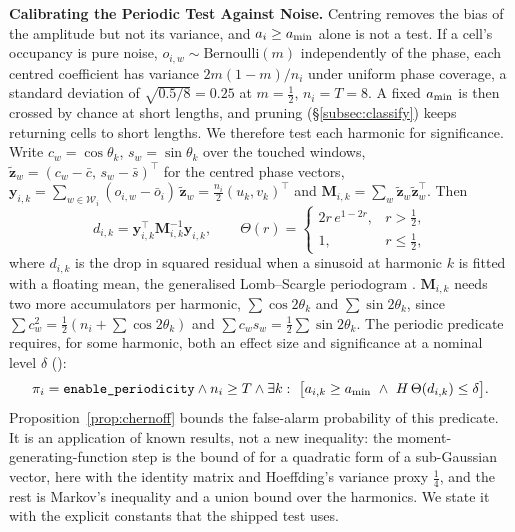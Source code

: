 \noindent\textbf{Calibrating the Periodic Test Against Noise.} Centring removes the bias of the amplitude but not its variance, and $a_i\ge a_{\min}$ alone is not a test. If a cell's occupancy is pure noise, $o_{i,w}\sim\mathrm{Bernoulli}(m)$ independently of the phase, each centred coefficient has variance $2m(1{-}m)/n_i$ under uniform phase coverage, a standard deviation of $\sqrt{0.5/8}=0.25$ at $m{=}\tfrac12$, $n_i{=}T{=}8$. A fixed $a_{\min}$ is then crossed by chance at short lengths, and pruning (\S\ref{subsec:classify}) keeps returning cells to short lengths. We therefore test each harmonic for significance. Write $c_w=\cos\theta_k$, $s_w=\sin\theta_k$ over the touched windows, $\tilde{\mathbf{z}}_w=(c_w-\bar c,\,s_w-\bar s)^{\top}$ for the centred phase vectors, $\mathbf{y}_{i,k}=\sum_{w\in\mathcal{W}_i}(o_{i,w}-\bar o_i)\,\tilde{\mathbf{z}}_w=\tfrac{n_i}{2}(u_k,v_k)^{\top}$ and $\mathbf{M}_{i,k}=\sum_{w}\tilde{\mathbf{z}}_w\tilde{\mathbf{z}}_w^{\top}$. Then
\begin{equation}\label{eq:dchi}
  d_{i,k}=\mathbf{y}_{i,k}^{\top}\mathbf{M}_{i,k}^{-1}\mathbf{y}_{i,k},\qquad \Theta(r)=\begin{cases}2r\,e^{1-2r}, & r>\tfrac12,\\ 1, & r\le\tfrac12,\end{cases}
\end{equation}
where $d_{i,k}$ is the drop in squared residual when a sinusoid at harmonic $k$ is fitted with a floating mean, the generalised Lomb--Scargle periodogram \citep{zechmeister2009gls}. $\mathbf{M}_{i,k}$ needs two more accumulators per harmonic, $\sum\cos2\theta_k$ and $\sum\sin2\theta_k$, since $\sum c_w^2=\tfrac12(n_i+\sum\cos2\theta_k)$ and $\sum c_ws_w=\tfrac12\sum\sin2\theta_k$. The periodic predicate requires, for some harmonic, both an effect size and significance at a nominal level $\delta$ ():
\begin{equation}\label{eq:periodic}
  \pi_i=\texttt{enable\_periodicity}\land n_i\ge T\land\exists k:\ \big[a_{i,k}\ge\amin\ \land\ H\,\Theta(d_{i,k})\le\delta\big].
\end{equation}
Proposition~\ref{prop:chernoff} bounds the false-alarm probability of this predicate. It is an application of known results, not a new inequality: the moment-generating-function step is the bound of \citet[Remark~2]{hsu2012tail} for a quadratic form of a sub-Gaussian vector, here with the identity matrix and Hoeffding's variance proxy $\tfrac14$, and the rest is Markov's inequality and a union bound over the harmonics. We state it with the explicit constants that the shipped test uses.

